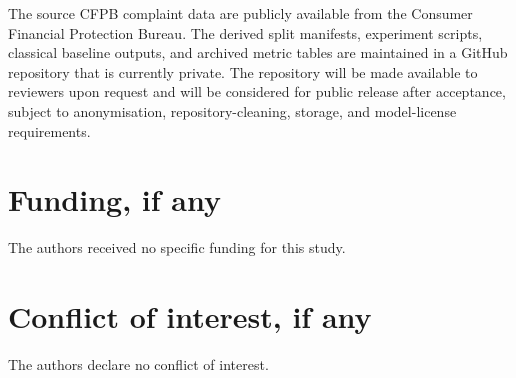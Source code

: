 \documentclass{elektr}
\begin{document}
The source CFPB complaint data are publicly available from the Consumer Financial Protection Bureau. The derived split manifests, experiment scripts, classical baseline outputs, and archived metric tables are maintained in a GitHub repository that is currently private. The repository will be made available to reviewers upon request and will be considered for public release after acceptance, subject to anonymisation, repository-cleaning, storage, and model-license requirements.

\section*{Funding, if any}

The authors received no specific funding for this study.

\section*{Conflict of interest, if any}

The authors declare no conflict of interest.
\end{document}
